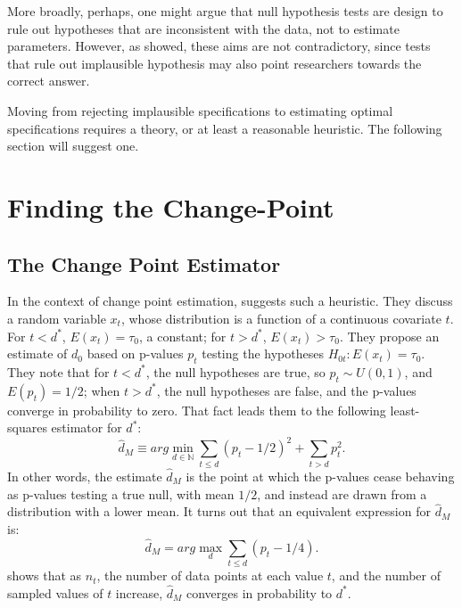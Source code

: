 \documentclass[lineno]{biometrika}\usepackage[]{graphicx}\usepackage[]{color}
\newcommand{\dstar}{d^*}
\newcommand{\dhatm}{\hat{d}_M}
\newcommand{\EE}{E}
\begin{document}
More broadly, perhaps, one might argue that null hypothesis tests are
design to rule out hypotheses that are inconsistent with the data, not
to estimate parameters.
However, as \citet{hodgeslehmann} showed, these aims are not
contradictory, since tests that rule out implausible hypothesis may also
point researchers towards the correct answer.

Moving from rejecting implausible specifications to estimating optimal
specifications requires a theory, or at least a reasonable heuristic.
The following section will suggest one.

\section{Finding the Change-Point}\label{sec:change-point}
\subsection{The Change Point Estimator}
In the context of change point estimation, \citet{mallik} suggests
such a heuristic.
They discuss a random variable $x_t$, whose distribution is a function
of a continuous covariate $t$.
For $t<d^*$, $\EE (x_t)=\tau_0$, a constant; for $t>\dstar$, $\EE
(x_t)>\tau_0$.
They propose an estimate of $d_0$ based on p-values $p_t$
testing the hypotheses $H_{0t}:\EE (x_t)=\tau_0$.
They note that for $t<\dstar$, the null hypotheses are true, so
$p_t\sim U(0,1)$, and $\EE (p_t) =1/2$; when $t>\dstar$, the null hypotheses are false, and
the p-values converge in probability to zero.
That fact leads them to the following least-squares estimator for
$\dstar$:
\begin{equation*}
\dhatm\equiv arg\displaystyle\min_{d\in \mathbb{N}} \displaystyle\sum_{t\le d} (p_t -1/2)^2 +
\displaystyle\sum_{t>d} p_t^2.
\end{equation*}
In other words, the estimate $\dhatm$ is the point at which the
p-values cease behaving as p-values testing a true null, with mean
$1/2$, and instead are drawn from a distribution with a lower mean.
It turns out that an equivalent expression for $\dhatm$ is:
\begin{equation*}
\dhatm=arg\displaystyle\max_d \displaystyle\sum_{t\le d} (p_t-1/4).
\end{equation*}
\citet{mallik} shows that as $n_t$, the number of data points at each value
$t$, and the number of sampled values of $t$ increase, $\dhatm$
converges in probability to $\dstar$.
\end{document}

